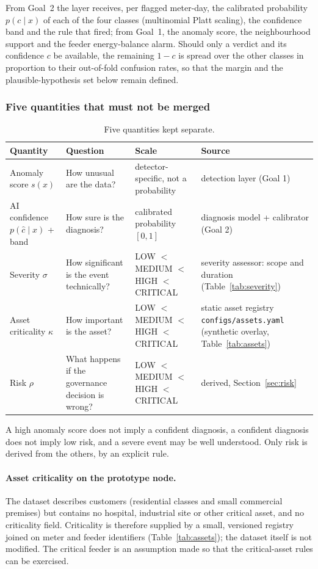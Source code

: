 \documentclass[11pt,a4paper]{article}
\renewcommand{\_}{\textunderscore\allowbreak}
\begin{document}
From Goal~2 the layer receives, per flagged meter-day, the calibrated probability $p(c\mid x)$ of each of the
four classes (multinomial Platt scaling), the confidence band and the rule that fired; from Goal~1, the anomaly
score, the neighbourhood support and the feeder energy-balance alarm. Should only a verdict and its
confidence $c$ be available, the remaining $1-c$ is spread over the other classes in proportion to their
out-of-fold confusion rates, so that the margin and the plausible-hypothesis set below remain defined.

\subsubsection{Five quantities that must not be merged}
\begin{table}[H]
\centering\small
\begin{tabularx}{\textwidth}{@{}>{\raggedright\arraybackslash}p{2.5cm}>{\raggedright\arraybackslash}p{3.6cm}>{\raggedright\arraybackslash}p{3.7cm}L@{}}
\toprule
\textbf{Quantity} & \textbf{Question} & \textbf{Scale} & \textbf{Source} \\
\midrule
Anomaly score $s(x)$ & How unusual are the data? & detector-specific, not a probability & detection layer (Goal 1) \\
AI confidence $p(\hat c\mid x)$ + band & How sure is the diagnosis? & calibrated probability $[0,1]$ & diagnosis model + calibrator (Goal 2) \\
Severity $\sigma$ & How significant is the event technically? & LOW $<$ MEDIUM $<$ HIGH $<$ CRITICAL & severity assessor: scope and duration (Table~\ref{tab:severity}) \\
Asset criticality $\kappa$ & How important is the asset? & LOW $<$ MEDIUM $<$ HIGH $<$ CRITICAL & static asset registry \texttt{configs/assets.yaml} (synthetic overlay, Table~\ref{tab:assets}) \\
Risk $\rho$ & What happens if the governance decision is wrong? & LOW $<$ MEDIUM $<$ HIGH $<$ CRITICAL & derived, Section~\ref{sec:risk} \\
\bottomrule
\end{tabularx}
\caption{Five quantities kept separate.}
\end{table}
A high anomaly score does not imply a confident diagnosis, a confident diagnosis does not imply low risk, and
a severe event may be well understood. Only risk is derived from the others, by an explicit rule.

\paragraph{Asset criticality on the prototype node.} The dataset describes customers (residential classes and
small commercial premises) but contains no hospital, industrial site or other critical asset, and no
criticality field. Criticality is therefore supplied by a small, versioned registry joined on meter and feeder
identifiers (Table~\ref{tab:assets}); the dataset itself is not modified. The critical feeder is an assumption
made so that the critical-asset rules can be exercised.
\end{document}
